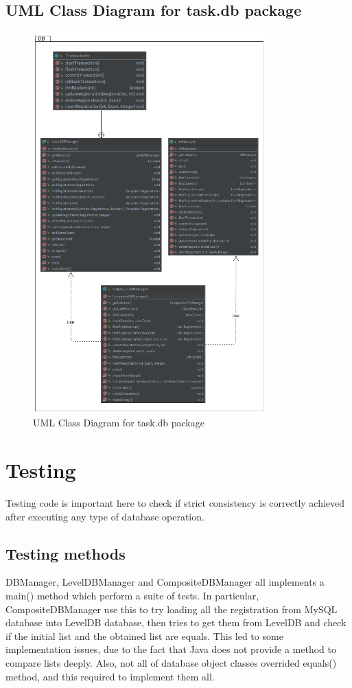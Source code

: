 \documentclass{report}
\begin{document}
\subsection*{UML Class Diagram for task.db package}
\begin{figure} [!ht]
	\centering
	\includegraphics[width=0.8\textwidth]{jpaLevelDB-DBPackage.png}
	\caption{UML Class Diagram for task.db package}
	\label{fig:leveldb-classdia}
\end{figure}


\section*{Testing}
Testing code is important here to check if strict consistency is correctly achieved after executing any type of database operation.

\subsection*{Testing methods}
DBManager, LevelDBManager and CompositeDBManager all implements a main() method which perform a suite of tests. In particular, CompositeDBManager use this to try loading all the registration from MySQL database into LevelDB database, then tries to get them from LevelDB and check if the initial list and the obtained list are equals. This led to some implementation issues, due to the fact that Java does not provide a method to compare lists deeply. Also, not all of database object classes overrided equals() method, and this required to implement them all.
\end{document}
